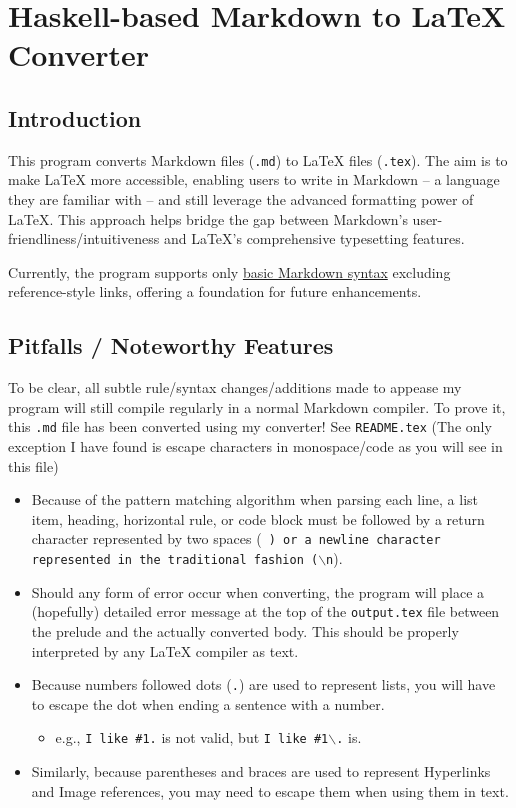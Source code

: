 \documentclass{article}
\begin{document}
    \pagestyle{empty}

\section{Haskell-based Markdown to LaTeX Converter}


\subsection{Introduction}

This program converts Markdown files (\texttt{.md}) to LaTeX files (\texttt{.tex}). The aim is to make LaTeX more accessible, enabling users to write in Markdown -- a language they are familiar with -- and still leverage the advanced formatting power of LaTeX. This approach helps bridge the gap between Markdown’s user-friendliness/intuitiveness and LaTeX's comprehensive typesetting features.

Currently, the program supports only \href{https://www.markdownguide.org/basic-syntax/}{basic Markdown syntax} excluding reference-style links, offering a foundation for future enhancements.


\subsection{Pitfalls / Noteworthy Features}

To be clear, all subtle rule/syntax changes/additions made to appease my program will still compile regularly in a normal Markdown compiler. To prove it, this \texttt{.md} file has been converted using my converter! See \texttt{README.tex} (The only exception I have found is escape characters in monospace/code as you will see in this file)

\begin{itemize}
    \item  Because of the pattern matching algorithm when parsing each line, a list item, heading, horizontal rule, or code block must be followed by a return character represented by two spaces (\texttt{  \texttt{) or a newline character represented in the traditional fashion (}$\backslash$n}).
    \item  Should any form of error occur when converting, the program will place a (hopefully) detailed error message at the top of the \texttt{output.tex} file between the prelude and the actually converted body. This should be properly interpreted by any LaTeX compiler as text.
    \item  Because numbers followed dots (\texttt{.}) are used to represent lists, you will have to escape the dot when ending a sentence with a number.
\begin{itemize}
    \item  e.g., \texttt{I like \#1.} is not valid, but \texttt{I like \#1$\backslash$.} is.
\end{itemize}
    \item Similarly, because parentheses and braces are used to represent Hyperlinks and Image references, you may need to escape them when using them in text.
\end{itemize}
\end{document}

